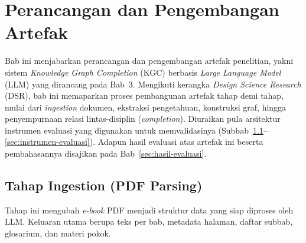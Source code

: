 \documentclass[main]{subfiles}
\begin{document}
\ifSubfilesClassLoaded{}{\setcounter{chapter}{3}}

\chapter{Perancangan dan Pengembangan Artefak}

Bab ini menjabarkan perancangan dan pengembangan artefak penelitian, yakni
sistem \textit{Knowledge Graph Completion} (KGC) berbasis \textit{Large Language
Model} (LLM) yang dirancang pada Bab~3. Mengikuti kerangka \textit{Design
Science Research} (DSR), bab ini memaparkan proses pembangunan artefak tahap
demi tahap, mulai dari \textit{ingestion} dokumen, ekstraksi pengetahuan,
konstruksi graf, hingga penyempurnaan relasi lintas-disiplin
(\textit{completion}). Diuraikan pula arsitektur instrumen evaluasi yang
digunakan untuk memvalidasinya
(Subbab~\ref{sec:ingestion}--\ref{sec:instrumen-evaluasi}). Adapun hasil
evaluasi atas artefak ini beserta pembahasannya disajikan pada
Bab~\ref{sec:hasil-evaluasi}.

\section{Tahap Ingestion (PDF Parsing)}\label{sec:ingestion}

Tahap ini mengubah \textit{e-book} PDF menjadi struktur data yang siap
diproses oleh LLM. Keluaran utama berupa teks per bab, metadata halaman,
daftar subbab, glosarium, dan materi pokok.
\end{document}
